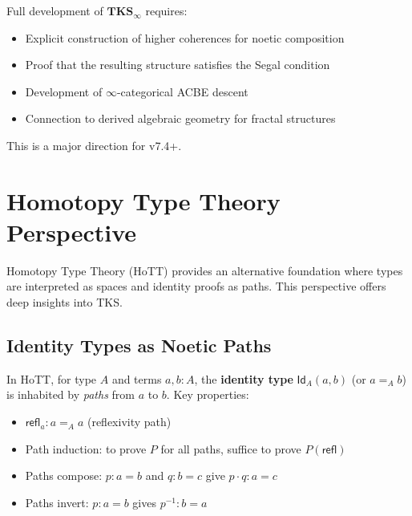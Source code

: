 \begin{remark}
\label{rem:infty-future}
Full development of $\mathbf{TKS}_\infty$ requires:
\begin{itemize}
  \item Explicit construction of higher coherences for noetic composition
  \item Proof that the resulting structure satisfies the Segal condition
  \item Development of $\infty$-categorical ACBE descent
  \item Connection to derived algebraic geometry for fractal structures
\end{itemize}
This is a major direction for v7.4+.
\end{remark}

\section{Homotopy Type Theory Perspective}
\label{sec:hott-perspective}

Homotopy Type Theory (HoTT) provides an alternative foundation where types
are interpreted as spaces and identity proofs as paths. This perspective
offers deep insights into TKS.

\subsection{Identity Types as Noetic Paths}
\label{subsec:identity-types-paths}

\begin{definition}
\label{def:identity-type-hott}
In HoTT, for type $A$ and terms $a, b : A$, the \textbf{identity type}
$\mathsf{Id}_A(a, b)$ (or $a =_A b$) is inhabited by \emph{paths} from $a$ to $b$.
Key properties:
\begin{itemize}
  \item $\mathsf{refl}_a : a =_A a$ (reflexivity path)
  \item Path induction: to prove $P$ for all paths, suffice to prove $P(\mathsf{refl})$
  \item Paths compose: $p : a = b$ and $q : b = c$ give $p \cdot q : a = c$
  \item Paths invert: $p : a = b$ gives $p^{-1} : b = a$
\end{itemize}
\end{definition}

